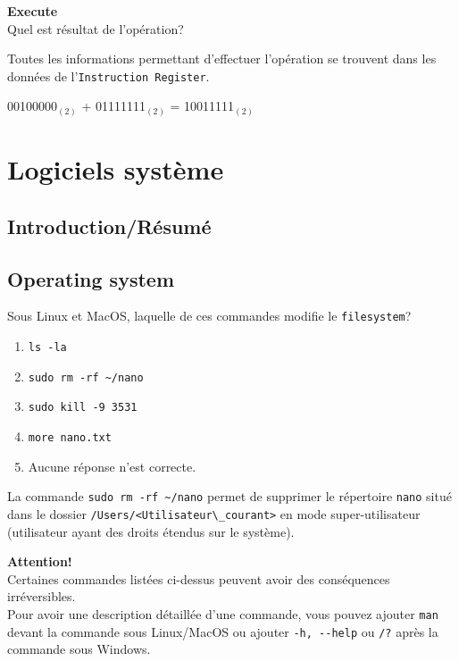 \begin{Exercice}[5 minutes] \textbf{Execute}\\
    Quel est résultat de l'opération?
\end{Exercice}

   \begin{conseil}
        Toutes les informations permettant d’effectuer l’opération se trouvent dans les données de l’\lstinline{Instruction Register}.
    \end{conseil}

\begin{solution}
    00100000$_{(2)}$ + 01111111$_{(2)}$ = 10011111$_{(2)}$
\end{solution}


\section{Logiciels système}

\subsection{Introduction/Résumé}

\subsection{Operating system}

\begin{Exercice}[5 minutes]
    Sous Linux et MacOS, laquelle de ces commandes modifie le \lstinline{filesystem}?
    \begin{enumerate}
        \item \lstinline{ls -la}
        \item \lstinline{sudo rm -rf ~/nano}
        \item \lstinline{sudo kill -9 3531}
        \item \lstinline{more nano.txt}
        \item Aucune réponse n'est correcte.
    \end{enumerate}
    \begin{solution}
        La commande \lstinline{sudo rm -rf ~/nano} permet de supprimer le répertoire \lstinline{nano} situé dans le dossier \lstinline{/Users/<Utilisateur\_courant>} en mode super-utilisateur (utilisateur ayant des droits étendus sur le système).
    \end{solution}
    \begin{conseil}
        \textbf{Attention!}\\
        Certaines commandes listées ci-dessus peuvent avoir des conséquences irréversibles.\\
        Pour avoir une description détaillée d'une commande, vous pouvez ajouter \lstinline{man} devant la commande sous Linux/MacOS ou ajouter \lstinline{-h, --help} ou \lstinline{/?} après la commande sous Windows.
    \end{conseil}
\end{Exercice}

